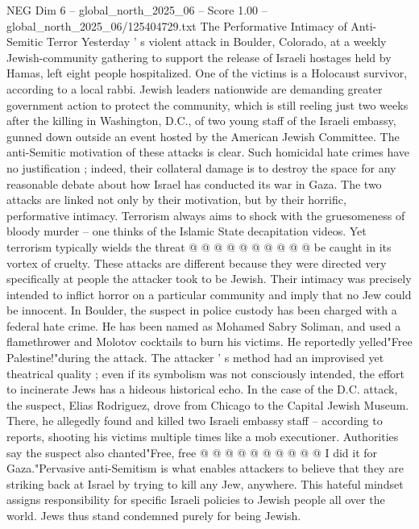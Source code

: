 \begin{textsample}{NEG Dim 6 – global\_north\_2025\_06 – Score 1.00 – global\_north\_2025\_06/125404729.txt}  \label{ex:f6_neg_425}
The Performative Intimacy of Anti-Semitic Terror Yesterday ' s violent attack in Boulder, Colorado, at a weekly Jewish-community gathering to support the release of Israeli hostages held by Hamas, left eight people hospitalized.
One of the victims is a Holocaust survivor, according to a local rabbi.
Jewish leaders nationwide are demanding greater government action to protect the community, which is still reeling just two weeks after the killing in Washington, D.C., of two young staff of the Israeli embassy, gunned down outside an event hosted by the American Jewish Committee.
The anti-Semitic motivation of these attacks is clear.
Such homicidal hate crimes have no justification ; indeed, their collateral damage is to destroy the space for any reasonable debate about how Israel has conducted its war in Gaza.
The two attacks are linked not only by their motivation, but by their horrific, performative intimacy.
Terrorism always aims to shock with the gruesomeness of bloody murder -- one thinks of the Islamic State decapitation videos.
Yet terrorism typically wields the threat @ @ @ @ @ @ @ @ @ @ be caught in its vortex of cruelty.
These attacks are different because they were directed very specifically at people the attacker took to be Jewish.
Their intimacy was precisely intended to inflict horror on a particular community and imply that no Jew could be innocent.
In Boulder, the suspect in police custody has been charged with a federal hate crime.
He has been named as Mohamed Sabry Soliman, and used a flamethrower and Molotov cocktails to burn his victims.
He reportedly yelled"Free Palestine!"during the attack.
The attacker ' s method had an improvised yet theatrical quality ; even if its symbolism was not consciously intended, the effort to incinerate Jews has a hideous historical echo.
In the case of the D.C. attack, the suspect, Elias Rodriguez, drove from Chicago to the Capital Jewish Museum.
There, he allegedly found and killed two Israeli embassy staff -- according to reports, shooting his victims multiple times like a mob executioner.
Authorities say the suspect also chanted"Free, free @ @ @ @ @ @ @ @ @ @ I did it for Gaza."Pervasive anti-Semitism is what enables attackers to believe that they are striking back at Israel by trying to kill any Jew, anywhere.
This hateful mindset assigns responsibility for specific Israeli policies to Jewish people all over the world.
Jews thus stand condemned purely for being Jewish.

\end{textsample}
